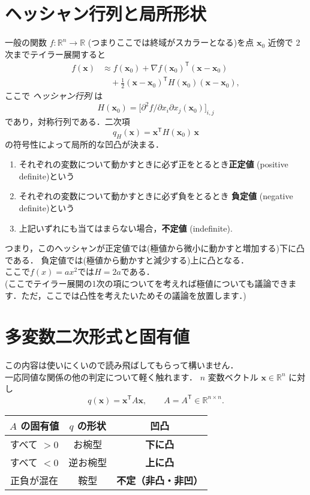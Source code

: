 \documentclass[11pt]{jsarticle}
\begin{document}
\section{ヘッシャン行列と局所形状}
一般の関数 \(f:\mathbb R^{n}\to\mathbb R\) (つまりここでは終域がスカラーとなる)を点 \(\mathbf x_{0}\) 近傍で 2 次までテイラー展開すると
\begin{align*}
  f(\mathbf x) &\approx f(\mathbf x_{0})
  +\nabla f(\mathbf x_{0})^{\mathsf T}(\mathbf x-\mathbf x_{0})\\
  &\quad+\frac12(\mathbf x-\mathbf x_{0})^{\mathsf T}H(\mathbf x_{0})(\mathbf x-\mathbf x_{0}),
\end{align*}
ここで \emph{ヘッシャン行列} は
\[
  H(\mathbf x_{0})=\bigl[\partial^{2}f/\partial x_{i}\partial x_{j}(\mathbf x_{0})\bigr]_{i,j}
\]
であり，対称行列である．二次項
\[
  q_{H}(\mathbf x)=\mathbf x^{\mathsf T}H(\mathbf x_{0})\,\mathbf x
\]
の符号性によって局所的な凹凸が決まる．
\begin{enumerate}
  \item それぞれの変数について動かすときに必ず正をとるとき\textbf{正定値} (positive definite)という\quad
        
  \item それぞれの変数について動かすときに必ず負をとるとき \textbf{負定値} (negative definite)という\quad
        
  \item 上記いずれにも当てはまらない場合，\textbf{不定値} (indefinite).
\end{enumerate}
つまり，このへッシャンが正定値では(極値から微小に動かすと増加する)下に凸である．
負定値では(極値から動かすと減少する)上に凸となる．\\
ここで\(f(x)= ax^2\)では\(H = 2a\)である．\\
(ここでテイラー展開の1次の項についてを考えれば極値についても議論できます．ただ，ここでは凸性を考えたいためその議論を放置します．)


\section{多変数二次形式と固有値}
この内容は使いにくいので読み飛ばしてもらって構いません．\\一応同値な関係の他の判定について軽く触れます．
\(n\) 変数ベクトル \(\mathbf x\in\mathbb R^{n}\) に対し
\[
  q(\mathbf x)=\mathbf x^{\mathsf T}A\mathbf x,\qquad A=A^{\mathsf T}\in\mathbb R^{n\times n}.
\]

\begin{center}
\begin{tabular}{|c|c|c|}
\hline
\(A\) の固有値 & \(q\) の形状 & 凹凸\\
\hline
すべて \(>0\) & お椀型 & \textbf{下に凸}\\
すべて \(<0\) & 逆お椀型 & \textbf{上に凸}\\
正負が混在 & 鞍型 & \textbf{不定（非凸・非凹）}\\
\hline
\end{tabular}
\end{center}
\end{document}
